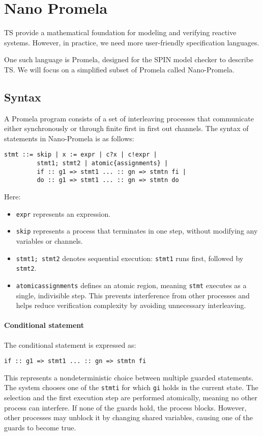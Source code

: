 \section{Nano Promela}

TS provide a mathematical foundation for modeling and verifying reactive systems. 
However, in practice, we need more user-friendly specification languages.

One such language is Promela, designed for the SPIN model checker to describe TS. 
We will focus on a simplified subset of Promela called Nano-Promela.

\subsection{Syntax}
A Promela program consists of a set of interleaving processes that communicate either synchronously or through finite first in first out channels.
The syntax of statements in Nano-Promela is as follows:
\begin{verbatim}
stmt ::= skip | x := expr | c?x | c!expr |
         stmt1; stmt2 | atomic{assignments} |
         if :: g1 => stmt1 ... :: gn => stmtn fi |
         do :: g1 => stmt1 ... :: gn => stmtn do
\end{verbatim}
Here: 
\begin{itemize}
    \item \texttt{expr} represents an expression.
    \item \texttt{skip} represents a process that terminates in one step, without modifying any variables or channels.
    \item \texttt{stmt1; stmt2} denotes sequential execution: \texttt{stmt1} runs first, followed by \texttt{stmt2}.
    \item \texttt{atomic{assignments}} defines an atomic region, meaning \texttt{stmt} executes as a single, indivisible step. 
        This prevents interference from other processes and helps reduce verification complexity by avoiding unnecessary interleaving.
\end{itemize}

\paragraph*{Conditional statement}
The conditional statement is expressed as: 
\begin{verbatim}
if :: g1 => stmt1 ... :: gn => stmtn fi
\end{verbatim}
This represents a nondeterministic choice between multiple guarded statements.
The system chooses one of the \texttt{stmti} for which \texttt{gi} holds in the current state.
The selection and the first execution step are performed atomically, meaning no other process can interfere.
If none of the guards hold, the process blocks.
However, other processes may unblock it by changing shared variables, causing one of the guards to become true.

